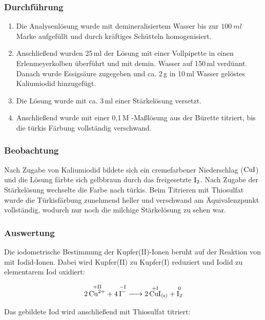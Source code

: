 \subsubsection{Durchführung}
\begin{enumerate}[label=\textbf{\alph*)}]
    \item Die Analysenlösung wurde mit demineralisiertem Wasser bis zur $\SI{100}{ml}$ Marke aufgefüllt und durch kräftiges Schütteln homogenisiert.
    \item Anschließend wurden 25\,ml der Lösung mit einer Vollpipette in einen Erlenmeyerkolben überführt und mit demin. Wasser auf 150\,ml verdünnt. Danach wurde Essigsäure zugegeben und ca. 2\,g in 10\,ml Wasser gelöstes Kaliumiodid hinzugefügt.
    \item Die Lösung wurde mit ca. 3\,ml einer Stärkelösung versetzt.
    \item Anschließend wurde mit einer 0,1\,M -Maßlösung aus der Bürette titriert, bis die türkis Färbung vollständig verschwand.
\end{enumerate}

\subsubsection{Beobachtung}
Nach Zugabe von Kaliumiodid bildete sich ein cremefarbener Niederschlag ($\ce{CuI}$) und die Lösung färbte sich gelbbraun durch das freigesetzte $\ce{I2}$. Nach Zugabe der Stärkelösung wechselte die Farbe nach türkis. Beim Titrieren mit Thiosulfat wurde die Türkisfärbung zunehmend heller und verschwand am Äquivalenzpunkt vollständig, wodurch nur noch die milchige Stärkelösung zu sehen war.

\subsubsection{Auswertung}

Die iodometrische Bestimmung der Kupfer(II)-Ionen beruht auf der Reaktion von  mit Iodid-Ionen. Dabei wird Kupfer(II) zu Kupfer(I) reduziert und Iodid zu elementarem Iod oxidiert:

\begin{equation}
    \ce{
        2 \overset{\mathrm{+II}}{\ce{Cu^{2+}}}
        + 4 \overset{\mathrm{-I}}{\ce{I^-}}
        -> 2 \overset{\mathrm{+I}}{\ce{CuI}}_{(s)}
        + \overset{\mathrm{0}}{\ce{I2}}
    }
\end{equation}

Das gebildete Iod wird anschließend mit Thiosulfat titriert:


